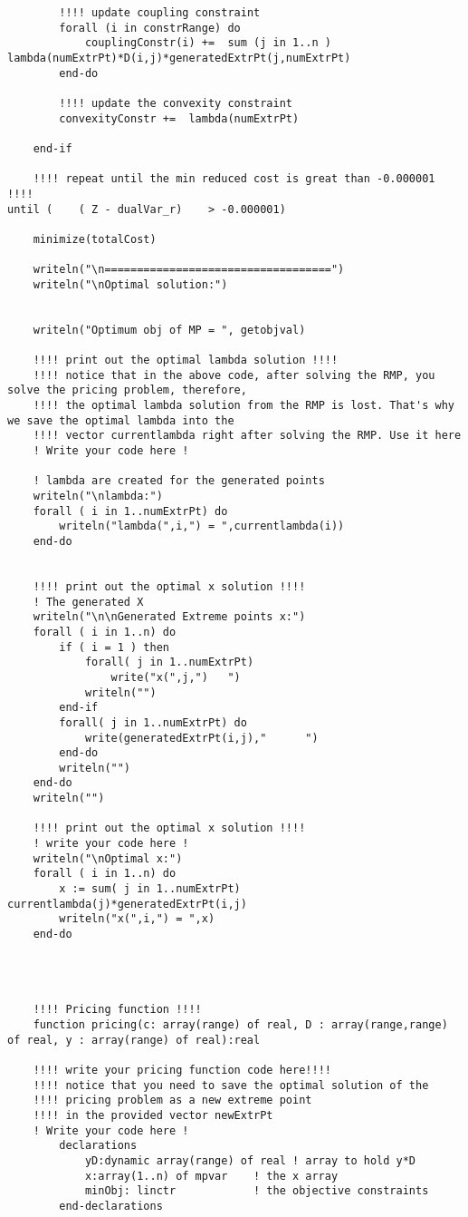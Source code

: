 \documentclass[twoside,12pt]{article}
\begin{document}
\begin{verbatim}
		!!!! update coupling constraint
		forall (i in constrRange) do
			couplingConstr(i) +=  sum (j in 1..n ) lambda(numExtrPt)*D(i,j)*generatedExtrPt(j,numExtrPt)
		end-do

		!!!! update the convexity constraint
		convexityConstr +=  lambda(numExtrPt)	
    	
    end-if 
    
    !!!! repeat until the min reduced cost is great than -0.000001 !!!!
until (    ( Z - dualVar_r)    > -0.000001)
	
	minimize(totalCost)
	
	writeln("\n===================================")
	writeln("\nOptimal solution:")
	
	
	writeln("Optimum obj of MP = ", getobjval)
	
	!!!! print out the optimal lambda solution !!!!
	!!!! notice that in the above code, after solving the RMP, you solve the pricing problem, therefore, 
	!!!! the optimal lambda solution from the RMP is lost. That's why we save the optimal lambda into the
	!!!! vector currentlambda right after solving the RMP. Use it here
    ! Write your code here !
    
	! lambda are created for the generated points
	writeln("\nlambda:")
	forall ( i in 1..numExtrPt) do
		writeln("lambda(",i,") = ",currentlambda(i))	
	end-do


	!!!! print out the optimal x solution !!!!
	! The generated X
	writeln("\n\nGenerated Extreme points x:")
	forall ( i in 1..n) do
		if ( i = 1 ) then
			forall( j in 1..numExtrPt) 
				write("x(",j,")   ")
			writeln("")
		end-if
		forall( j in 1..numExtrPt) do
			write(generatedExtrPt(i,j),"      ")
		end-do
		writeln("")
	end-do
	writeln("")

	!!!! print out the optimal x solution !!!!
	! write your code here !
	writeln("\nOptimal x:")
	forall ( i in 1..n) do
		x := sum( j in 1..numExtrPt) currentlambda(j)*generatedExtrPt(i,j)
		writeln("x(",i,") = ",x)
	end-do
	
		
		
		
    !!!! Pricing function !!!!
    function pricing(c: array(range) of real, D : array(range,range) of real, y : array(range) of real):real

	!!!! write your pricing function code here!!!!
	!!!! notice that you need to save the optimal solution of the 
	!!!! pricing problem as a new extreme point
	!!!! in the provided vector newExtrPt
	! Write your code here !
		declarations
			yD:dynamic array(range) of real ! array to hold y*D 
			x:array(1..n) of mpvar    ! the x array
			minObj: linctr            ! the objective constraints
		end-declarations
	

\end{verbatim}
\end{document}
